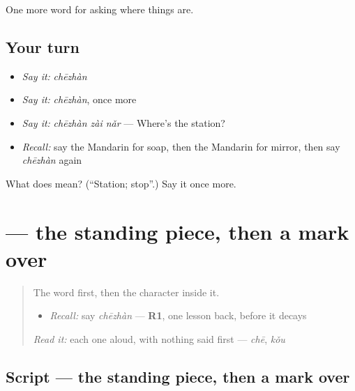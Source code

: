 \begin{grammarlens}[title={What you've built}]
One more word for asking where things are.
\end{grammarlens}

\subsection*{Your turn}
\begin{itemize}
\raggedright
  \item \emph{Say it:} \emph{chēzhàn}
  \item \emph{Say it:} \emph{chēzhàn}, once more
  \item \emph{Say it:} \emph{chēzhàn zài nǎr} — Where's the station?
  \item \emph{Recall:} say the Mandarin for soap, then the Mandarin for mirror, then say \emph{chēzhàn} again
\end{itemize}

\begin{tcolorbox}[breakable,colback=teal!4,colframe=teal!35!black,title={Before you move on}]
What does  mean? (\textquotedblleft{}Station; stop\textquotedblright{}.) Say it once more.
\end{tcolorbox}
\section[\texorpdfstring{\zh{站} (zhàn)}{站 (zhàn)}]{ — the standing piece, then a mark over }

\label{lesson:ZH-W106-zhan}



\begin{quote}
The word first, then the character inside it.

\begin{itemize}
\raggedright
  \item \emph{Recall:} say \emph{chēzhàn} — \textbf{R1}, one lesson back, before it decays
\end{itemize}

\begin{quote}
 
\end{quote}

\emph{Read it:} each one aloud, with nothing said first — \emph{chē}, \emph{kǒu}
\end{quote}

\subsection*{Script — the standing piece, then a mark over }

